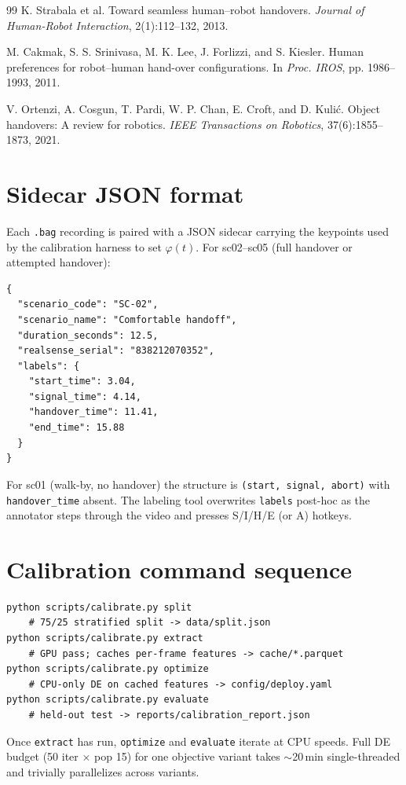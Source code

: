 \documentclass{article}
\newcommand{\code}[1]{\texttt{\small #1}}
\begin{document}
\begin{thebibliography}{99}
 K. Strabala et al. Toward seamless human--robot handovers. \emph{Journal of Human-Robot Interaction}, 2(1):112--132, 2013.

 M. Cakmak, S. S. Srinivasa, M. K. Lee, J. Forlizzi, and S. Kiesler. Human preferences for robot--human hand-over configurations. In \emph{Proc. IROS}, pp. 1986--1993, 2011.

 V. Ortenzi, A. Cosgun, T. Pardi, W. P. Chan, E. Croft, and D. Kuli\'c. Object handovers: A review for robotics. \emph{IEEE Transactions on Robotics}, 37(6):1855--1873, 2021.

\end{thebibliography}

\appendix

\section{Sidecar JSON format}\label{app:sidecar}

Each \code{.bag} recording is paired with a JSON sidecar carrying the keypoints used by the calibration harness to set $\varphi(t)$. For sc02--sc05 (full handover or attempted handover):
\begin{lstlisting}
{
  "scenario_code": "SC-02",
  "scenario_name": "Comfortable handoff",
  "duration_seconds": 12.5,
  "realsense_serial": "838212070352",
  "labels": {
    "start_time": 3.04,
    "signal_time": 4.14,
    "handover_time": 11.41,
    "end_time": 15.88
  }
}
\end{lstlisting}
For sc01 (walk-by, no handover) the structure is \code{(start, signal, abort)} with \code{handover\_time} absent. The labeling tool overwrites \code{labels} post-hoc as the annotator steps through the video and presses S/I/H/E (or A) hotkeys.

\section{Calibration command sequence}\label{app:cmd}

\begin{lstlisting}
python scripts/calibrate.py split
    # 75/25 stratified split -> data/split.json
python scripts/calibrate.py extract
    # GPU pass; caches per-frame features -> cache/*.parquet
python scripts/calibrate.py optimize
    # CPU-only DE on cached features -> config/deploy.yaml
python scripts/calibrate.py evaluate
    # held-out test -> reports/calibration_report.json
\end{lstlisting}
Once \code{extract} has run, \code{optimize} and \code{evaluate} iterate at CPU speeds. Full DE budget (50 iter $\times$ pop 15) for one objective variant takes $\sim$20\,min single-threaded and trivially parallelizes across variants.
\end{document}
